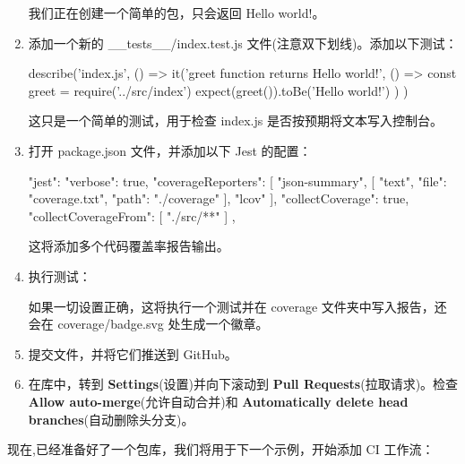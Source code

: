 \begin{enumerate}
我们正在创建一个简单的包，只会返回 Hello world!。

\item 
添加一个新的 \_\_tests\_\_/index.test.js 文件(注意双下划线)。添加以下测试：

\begin{shell}
describe('index.js', () => {
  it('greet function returns Hello world!', () => {
    const greet = require('../src/index')
    expect(greet()).toBe('Hello world!')
  })
})
\end{shell}

这只是一个简单的测试，用于检查 index.js 是否按预期将文本写入控制台。

\item 
打开 package.json 文件，并添加以下 Jest 的配置：

\begin{shell}
"jest": {
  "verbose": true,
  "coverageReporters": [
    "json-summary",
    [
      "text",
      {
        "file": "coverage.txt",
        "path": "./coverage"
      }
    ],
    "lcov"
  ],
  "collectCoverage": true,
  "collectCoverageFrom": [
    "./src/**"
  ]
},
\end{shell}

这将添加多个代码覆盖率报告输出。

\item 
执行测试： 


如果一切设置正确，这将执行一个测试并在 coverage 文件夹中写入报告，还会在 coverage/badge.svg 处生成一个徽章。

\item 
提交文件，并将它们推送到 GitHub。

\item 
在库中，转到 \textbf{Settings}(设置)并向下滚动到 \textbf{Pull Requests}(拉取请求)。检查 \textbf{Allow auto-merge}(允许自动合并)和 \textbf{Automatically delete head branches}(自动删除头分支)。
\end{enumerate}


现在,已经准备好了一个包库，我们将用于下一个示例，开始添加 CI 工作流：


